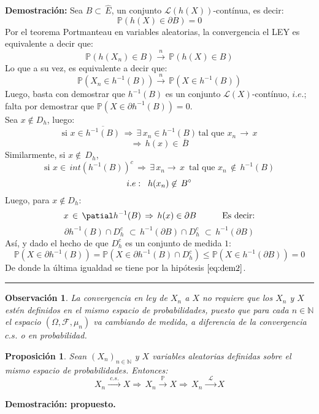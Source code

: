 \documentclass[a4paper]{article}
\newtheorem{prop}{Proposici\'on}
\numberwithin{equation}{subsection}
\newtheorem{obs}{Observación}
\def\N{\mathbb N}
\newcommand{\pb}{\mathbb{P}}
\begin{document}
\textbf{Demostración:} Sea $B \subset\,\hat{E}$, un conjunto $\mathcal{L}(h(X))$-contínua, es decir:
\begin{equation}
    \pb(h(X) \in \partial B) = 0
    \label{eq:dem2}
\end{equation}
Por el teorema Portmanteau en variables aleatorias, la convergencia el LEY es equivalente a decir que:
\[\pb(h(X_n)\in B) \xrightarrow{\,\,n\,\,}\,\pb(h(X)\in B)\]
Lo que a su vez, es equivalente a decir que:
\[\pb(X_n \in h^{-1}(B)) \xrightarrow{\,\,n\,\,}\,\pb(X \in h^{-1}(B))\]
Luego, basta con demostrar que $h^{-1}(B)$ es un conjunto $\mathcal{L}(X)$-contínuo, $i.e.$; falta por demostrar que $\pb(X \in \partial h^{-1}(B)) =0$.\\ \newline
Sea $x \not\in D_h$, luego:
\[\text{si }x\in\overline{h^{-1}(B)}\,\Rightarrow\,\exists\,x_n \in h^{-1}(B)\,\text{tal que }x_n\,\rightarrow\,x\]
\[\Rightarrow\,h(x)\in\,\overline{B}\]
Similarmente, si $x\not\in\,D_h$,
\[\text{si }x\in\,int\left(h^{-1}(B)\right)^{c}\,\Rightarrow\,\exists\,x_n \rightarrow\,x\,\text{ tal que  }x_n\,\not\in\,h^{-1}(B)\]
\[i.e:\hspace{0.2cm}h(x_n)\not\in\,B^{\circ}\]
Luego, para $x\not\in D_h$:
\[x\,\in\,\patial h^{-1}(B) \,\Rightarrow\,h(x)\in\partial B\,\hspace{1cm}\text{Es decir:}\]
\[\partial h^{-1}(B) \cap D_h^{c}\,\,\subset\,h^{-1}(\partial B)\cap D_h^{c}\,\,\subset\,h^{-1}(\partial B)\]
Así, y dado el hecho de que $D_h^{c}$ es un conjunto de medida $1$:
\[\pb(X \in \partial h^{-1}(B)) = \pb(X \in \partial h^{-1}(B) \cap D_h^{c}) \leq \pb(X \in h^{-1}(\partial B))=0\]
De donde la última igualdad se tiene por la hipótesis $\ref{eq:dem2}$.
\rule{0.7em}{0.7em}

\begin{obs}
La convergencia en ley de $X_n$ a $X$ no requiere que los $X_n$ y $X$ estén definidos en el mismo espacio de probabilidades, puesto que para cada $n\in\N$ el espacio $(\Omega,\mathcal{F},\mu_n)$ va cambiando de medida, a diferencia de la convergencia $c.s.$ o en probabilidad.
\end{obs}

\begin{prop}
Sean $(X_n)_{n\in\N}$ y $X$ variables aleatorias definidas sobre el mismo espacio de probabilidades. Entonces:
\[X_n\xrightarrow{\,\,c.s.\,\,} X \Rightarrow\,X_n \xrightarrow{\,\,\pb\,\,}X \Rightarrow\,X_n\,\xrightarrow{\,\,\mathcal{L}\,\,}X\]
\end{prop}
\textbf{Demostración: propuesto.}\\ \newline
\end{document}
